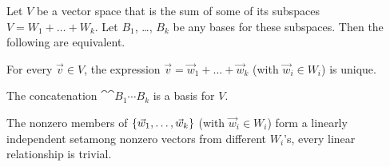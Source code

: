\begin{lemma} \label{le:UniqDecIffBasisDec}
Let $V$ be a vector space that is the sum of some of its subspaces
$V=W_1+\dots+W_k$.
Let $B_1$, \ldots, $B_k$ be any bases for these subspaces.
Then the following are equivalent.
\begin{tfae}
  \item For every $\vec{v}\in V$, the expression 
     $\vec{v}=\vec{w}_1+\dots+\vec{w}_k$ (with $\vec{w}_i\in W_i$)
     is unique.
  \item The concatenation $\cat{\cat{B_1}{\cdots}}{B_k}$ is a basis for $V$.
  \item The nonzero members of $\mbox{$\{\vec{w}_1,\dots,\vec{w}_k\}$}$
    (with $\vec{w}_i\in W_i$) form a linearly independent set\Dash among 
    nonzero vectors from different $W_i$'s, every linear relationship is 
    trivial.
\end{tfae}
\end{lemma}

